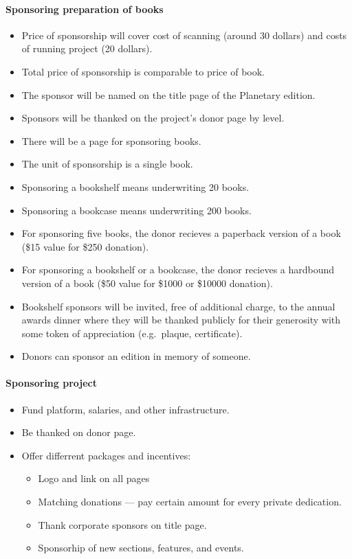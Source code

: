 \begin{itemize}
\begin{itemize}
\paragraph{Sponsoring preparation of books}

\begin{itemize}
\item
  Price of sponsorship will cover cost of scanning (around 30 dollars)
  and costs of running project (20 dollars).
\item
  Total price of sponsorship is comparable to price of book.
\item
  The sponsor will be named on the title page of the Planetary edition.
\item
  Sponsors will be thanked on the project's donor page by level.
\item
  There will be a page for sponsoring books.
\item
  The unit of sponsorship is a single book.
\item
  Sponsoring a bookshelf means underwriting 20 books.
\item
  Sponsoring a bookcase means underwriting 200 books.
\item
  For sponsoring five books, the donor recieves a paperback version of a
  book (\$15 value for \$250 donation).
\item
  For sponsoring a bookshelf or a bookcase, the donor recieves a
  hardbound version of a book (\$50 value for \$1000 or \$10000
  donation).
\item
  Bookshelf sponsors will be invited, free of additional charge, to the
  annual awards dinner where they will be thanked publicly for their
  generosity with some token of appreciation (e.g.~plaque, certificate).
\item
  Donors can sponsor an edition in memory of someone.
\end{itemize}

\paragraph{Sponsoring project}

\begin{itemize}
\item
  Fund platform, salaries, and other infrastructure.
\item
  Be thanked on donor page.
\item
  Offer differrent packages and incentives: 
  \begin{itemize}
  \item
    Logo and link on all pages 
  \item  
     Matching donations --- pay certain amount for every 
     private dedication. 
  \item 
     Thank corporate sponsors on title page. 
  \item   
     Sponsorhip of new sections, features, and events.
  \end{itemize}   
\end{itemize}


\end{itemize}
\end{itemize}
